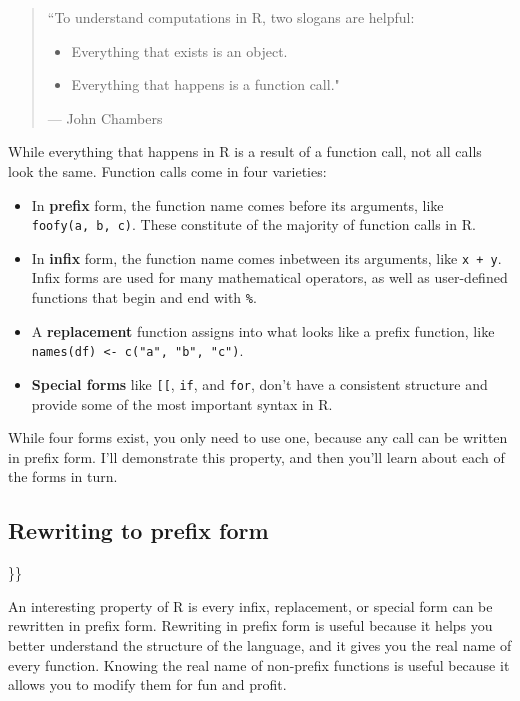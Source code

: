 \documentclass[]{book}
\providecommand{\tightlist}{%
  \setlength{\itemsep}{0pt}\setlength{\parskip}{0pt}}
\theoremstyle{definition}
\theoremstyle{definition}
\theoremstyle{definition}
\theoremstyle{remark}
\begin{document}
\begin{quote}
``To understand computations in R, two slogans are helpful:

\begin{itemize}
\tightlist
\item
  Everything that exists is an object.
\item
  Everything that happens is a function call."
\end{itemize}

--- John Chambers
\end{quote}

While everything that happens in R is a result of a function call, not
all calls look the same. Function calls come in four varieties:

\begin{itemize}
\item
  In \textbf{prefix} form, the function name comes before its arguments,
  like \texttt{foofy(a,\ b,\ c)}. These constitute of the majority of
  function calls in R.
\item
  In \textbf{infix} form, the function name comes inbetween its
  arguments, like \texttt{x\ +\ y}. Infix forms are used for many
  mathematical operators, as well as user-defined functions that begin
  and end with \texttt{\%}.
\item
  A \textbf{replacement} function assigns into what looks like a prefix
  function, like \texttt{names(df)\ \textless{}-\ c("a",\ "b",\ "c")}.
\item
  \textbf{Special forms} like \texttt{{[}{[}}, \texttt{if}, and
  \texttt{for}, don't have a consistent structure and provide some of
  the most important syntax in R.
\end{itemize}

While four forms exist, you only need to use one, because any call can
be written in prefix form. I'll demonstrate this property, and then
you'll learn about each of the forms in turn.

\subsection{Rewriting to prefix form}\label{rewriting-to-prefix-form}

\}\}

An interesting property of R is every infix, replacement, or special
form can be rewritten in prefix form. Rewriting in prefix form is useful
because it helps you better understand the structure of the language,
and it gives you the real name of every function. Knowing the real name
of non-prefix functions is useful because it allows you to modify them
for fun and profit.
\end{document}
